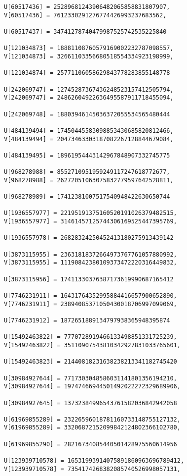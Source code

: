 \documentclass[a4paper]{article}
\begin{document}
\begin{verbatim}
U[60517436] = 25289681243906482065858831807907, 
V[60517436] = 7612330291276774426993237683562, 

U[60517437] = 34741278740479987525742535225840

U[121034873] = 18881108760579169002232787098557, 
V[121034873] = 32661103356680518554334923198999, 

U[121034874] = 25771106058629843778283855148778

U[242069747] = 12745287367436248523157412505794, 
V[242069747] = 24862604922636495587911718455094, 

U[242069748] = 18803946145036372055534565480444

U[484139494] = 17450445583098853430685820812466, 
V[484139494] = 20473463303187082267128844679084, 

U[484139495] = 18961954443142967848907332745775

U[968278988] = 8552710951959249117247618772677, 
V[968278988] = 26272051063075832779597642528811, 

U[968278989] = 17412381007517540948422630650744

U[1936557977] = 22195191375160520191026379482515, 
V[1936557977] = 31461457125744306169525447395769, 

U[1936557978] = 26828324250452413180275913439142

U[3873115955] = 23631818372664973767761057880992, 
V[3873115955] = 11190842380109373472220316449832, 

U[3873115956] = 17411330376387173619990687165412

U[7746231911] = 16431764352995884416657900652890, 
V[7746231911] = 23894085371050430018706997099069, 

U[7746231912] = 1872651889134797938365948395874

U[15492463822] = 7770728919466133498851331725239, 
V[15492463822] = 35110907543810342927831033765601, 

U[15492463823] = 21440818231638238213341182745420

U[30984927644] = 7717303048586031141801356194210, 
V[30984927644] = 19747466944501492022272329689906, 

U[30984927645] = 13732384996543761582036842942058

U[61969855289] = 23226596018781160733148755127132, 
V[61969855289] = 33206872152099842124802366102780, 

U[61969855290] = 28216734085440501428975560614956

U[123939710578] = 16531993914075891860963696789412, 
V[123939710578] = 7354174268382085740526998057131, 


\end{verbatim}
\end{document}
